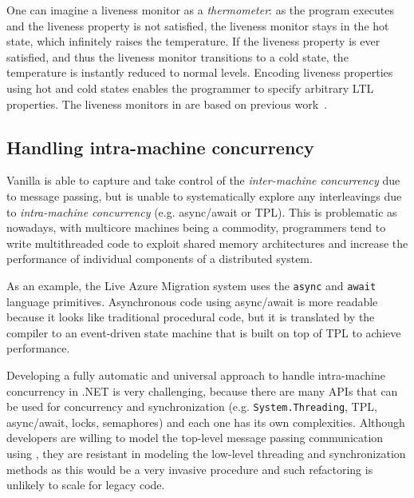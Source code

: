 One can imagine a liveness monitor as a \emph{thermometer}: as the program executes and the liveness property is not satisfied, the liveness monitor stays in the hot state, which infinitely raises the temperature. If the liveness property is ever satisfied, and thus the liveness monitor transitions to a cold state, the temperature is instantly reduced to normal levels. Encoding liveness properties using hot and cold states enables the programmer to specify arbitrary LTL properties. The liveness monitors in \psharp are based on previous work~\cite{?}. 


\subsection{Handling intra-machine concurrency}
\label{sec:psharp:async}

Vanilla \psharp is able to capture and take control of the \emph{inter-machine concurrency} due to message passing, but is unable to systematically explore any interleavings due to \emph{intra-machine concurrency} (e.g. async/await or TPL). This is problematic as nowadays, with multicore machines being a commodity, programmers tend to write multithreaded code to exploit shared memory architectures and increase the performance of individual components of a distributed system.

As an example, the Live Azure Migration system uses the \texttt{async} and \texttt{await} \csharp {} language primitives. Asynchronous code using async/await is more readable because it looks like traditional procedural code, but it is translated by the compiler to an event-driven state machine that is built on top of TPL to achieve performance.


Developing a fully automatic and universal approach to handle intra-machine concurrency in .NET is very challenging, because there are many APIs that can be used for concurrency and synchronization (e.g. \texttt{System.Threading}, TPL, async/await, locks, semaphores) and each one has its own complexities. Although developers are willing to model the top-level message passing communication using \psharp, they are resistant in modeling the low-level threading and synchronization methods as this would be a very invasive procedure and such refactoring is unlikely to scale for legacy code.

